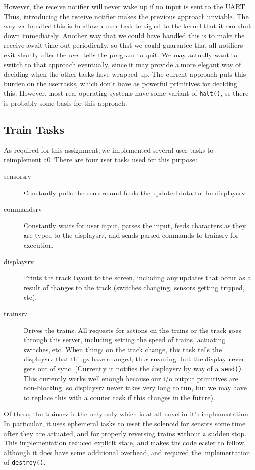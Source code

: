 \documentclass[titlepage]{article}
\begin{document}
However, the receive notifier will never wake up if no input is sent to the UART.\@
Thus, introducing the receive notifier makes the previous approach unviable.
The way we handled this is to allow a user task to signal to the kernel that it
can shut down immediately.
Another way that we could have handled this is to make the receive await time out
periodically, so that we could guarantee that all notifiers exit shortly after
the user tells the program to quit.
We may actually want to switch to that approach eventually, since it may provide
a more elegant way of deciding when the other tasks have wrapped up.
The current approach puts this burden on the usertasks, which don't have as powerful
primitives for deciding this.
However, most real operating systems have some variant of \texttt{halt()},
so there is probably some basis for this approach.

\subsection{Train Tasks}
As required for this assignment, we implemented several user tasks to
reimplement a0. There are four user tasks used for this purpose:
\begin{description}
\item[sensorsrv] Constantly polls the sensors and feeds the updated data to
	the displaysrv.
\item[commandsrv] Constantly waits for user input, parses the input, feeds
	characters as they are typed to the displaysrv, and sends parsed commands
	to trainsrv for execution.
\item[displaysrv] Prints the track layout to the screen, including any updates
	that occur as a result of changes to the track (switches changing, sensors
	getting tripped, etc).
\item[trainsrv] Drives the trains. All requests for actions on the trains or
	the track goes through this server, including setting the speed of trains,
	actuating switches, etc. When things on the track change, this task tells
	the displaysrv that things have changed, thus ensuring that the display
	never gets out of sync. (Currently it notifies the displaysrv by way of
	a \texttt{send()}. This currently works well enough because our i/o output
	primitives are non-blocking, so displaysrv never takes very long to run,
	but we may have to replace this with a courier task if this changes in
	the future).
\end{description}
Of these, the trainsrv is the only only which is at all novel in it's
implementation. In particular, it uses ephemeral tasks to reset the solenoid
for sensors some time after they are actuated, and for properly reversing
trains without a sudden stop. This implementation reduced explicit state, and
makes the code easier to follow, although it does have some additional
overhead, and required the implementation of \texttt{destroy()}.
\end{document}
